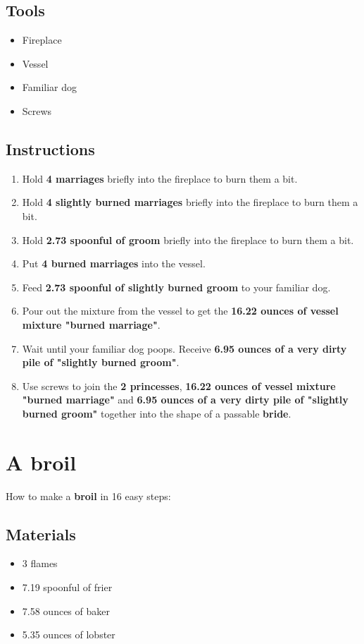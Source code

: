 \documentclass{article}
\begin{document}
\subsection{Tools}\begin{itemize}
\item 
Fireplace
\item 
Vessel
\item 
Familiar dog
\item 
Screws
\end{itemize}
\subsection{Instructions}\begin{enumerate}
\item 
Hold \textbf{4 marriages} briefly into the fireplace to burn them a bit.
\item 
Hold \textbf{4 slightly burned marriages} briefly into the fireplace to burn them a bit.
\item 
Hold \textbf{2.73 spoonful of groom} briefly into the fireplace to burn them a bit.
\item 
Put \textbf{4 burned marriages} into the vessel.
\item 
Feed \textbf{2.73 spoonful of slightly burned groom} to your familiar dog.
\item 
Pour out the mixture from the vessel to get the \textbf{16.22 ounces of vessel mixture "burned marriage"}.
\item 
Wait until your familiar dog poops. Receive \textbf{6.95 ounces of a very dirty pile of "slightly burned groom"}.
\item 
Use screws to join the \textbf{2 princesses}, \textbf{16.22 ounces of vessel mixture "burned marriage"} and \textbf{6.95 ounces of a very dirty pile of "slightly burned groom"} together into the shape of a passable \textbf{bride}.
\end{enumerate}
\newpage
\section{A broil}How to make a \textbf{broil} in 16 easy steps:

\subsection{Materials}\begin{itemize}
\item 
3 flames
\item 
7.19 spoonful of frier
\item 
7.58 ounces of baker
\item 
5.35 ounces of lobster
\end{itemize}
\end{document}

